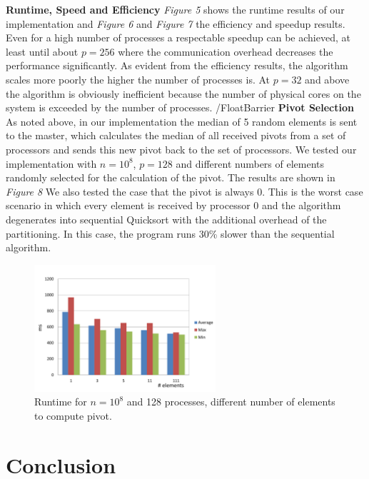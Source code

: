 \documentclass[12pt,a4paper]{article}
\begin{document}
\noindent\textbf{Runtime, Speed and Efficiency}\newline
\emph{Figure 5} shows the runtime results of our implementation and \emph{Figure 6} and \emph{Figure 7} the efficiency and speedup results. Even for a high number of processes a respectable speedup can be achieved, at least until about $p=256$ where the communication overhead decreases the performance significantly. As evident from the efficiency results, the algorithm scales more poorly the higher the number of processes is. At $p=32$ and above the algorithm is obviously inefficient because the number of physical cores on the system is exceeded by the number of processes.
\newline\newline
/FloatBarrier
\textbf{Pivot Selection}\newline
As noted above, in our implementation the median of 5 random elements is sent to the master, which calculates the median of all received pivots from a set of processors and sends this new pivot back to the set of processors. We tested our implementation with $n=10^{8}$, $p=128$ and different numbers of elements randomly selected for the calculation of the pivot. The results are shown in \emph{Figure 8} We also tested the case that the pivot is always 0. This is the worst case scenario in which every element is received by processor 0 and the algorithm degenerates into sequential Quicksort with the additional overhead of the partitioning. In this case, the program runs 30\% slower than the sequential algorithm.
\begin{figure}[h]
	\includegraphics[width=0.6\textwidth]{img/mpi_pivot.pdf}
	\caption{Runtime for $n=10^{8}$ and 128 processes, different number of elements to compute pivot.}
\end{figure}
\newline\newline

\section{Conclusion}
\end{document}
